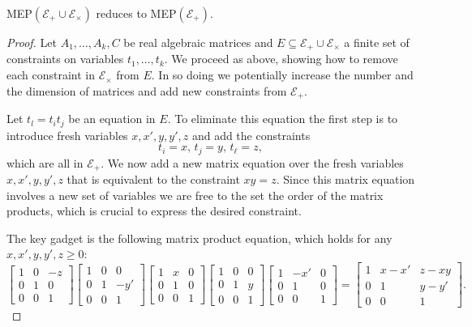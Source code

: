 \documentclass[format=acmsmall, review=false, screen=true]{acmart}
\begin{document}
\begin{proposition}
  MEP$(\mathcal{E}_{+}\cup\mathcal{E}_{\times})$ reduces to
  MEP$(\mathcal{E}_{+})$.
\label{lem:times}
\end{proposition}

\begin{proof}
  Let $A_1,\ldots,A_k,C$ be real algebraic matrices and
  $E \subseteq\mathcal{E}_{+}\cup\mathcal{E}_{\times}$ a finite set of
  constraints on variables $t_1,\ldots,t_k$.  We proceed as above,
  showing how to remove each constraint in
  $\mathcal{E}_{\times}$ from $E$.  In so doing we potentially increase the
  number and the dimension of matrices and add new constraints from $\mathcal{E}_{+}$.

  Let $t_l=t_{i} t_{j}$ be an equation in $E$.  To eliminate this equation
the first step is to introduce fresh
variables $x,x',y,y',z$ and add the constraints
\[ t_{i}=x,\, t_{j}=y,\, t_{\ell} = z,\]
which are all in $\mathcal{E}_{+}$.  We now add a new matrix equation
over the fresh variables $x,x',y,y',z$ that is equivalent to the
constraint $xy=z$.  Since this matrix equation involves a new set of
variables we are free to the set the order of the matrix products,
which is crucial to express the desired constraint.

The key gadget is the following matrix product equation,
  which holds for  any $x,x',y,y',z\geqslant0$:
\begin{equation*}
\begin{bmatrix}1&0&-z\\0&1&0\\0&0&1\end{bmatrix}
\begin{bmatrix}1&0&0\\0&1&-y'\\0&0&1\end{bmatrix}
\begin{bmatrix}1&x&0\\0&1&0\\0&0&1\end{bmatrix}
\begin{bmatrix}1&0&0\\0&1&y\\0&0&1\end{bmatrix}
\begin{bmatrix}1&-x'&0\\0&1&0\\0&0&1\end{bmatrix}=
\begin{bmatrix}1&x-x'&z-xy\\0&1&y-y'\\0&0&1\end{bmatrix}.
\end{equation*}


\end{proof}
\end{document}
